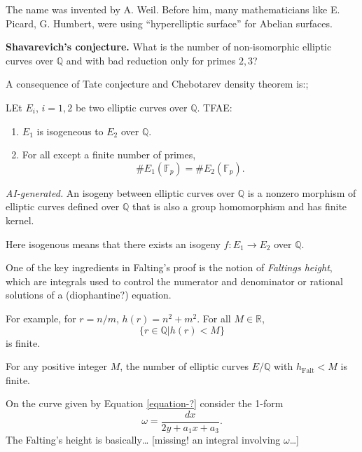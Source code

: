 The name was invented by A. Weil.
Before him, many mathematicians like E.
Picard,
G. Humbert, were using ``hyperelliptic
surface'' for Abelian surfaces.

\medskip\noindent
{\bf Shavarevich's conjecture.} 
What is the number of non-isomorphic elliptic
curves over $\mathbb{Q}$ and with bad
reduction only for primes $2,3$?

\medskip\noindent
A consequence of Tate conjecture
and Chebotarev density theorem is:;

\begin{theorem}
\label{theorem-tate-chebot-consequence}
LEt $E_i$, $i=1,2$ be two
elliptic curves over $\mathbb{Q}$.
TFAE:
\begin{enumerate}
\item $E_1$ is isogeneous to $E_2$
over $\mathbb{Q}$.
\item For all except a finite number
of primes,
$$
\# E_1(\mathbb{F}_p)
=\# E_2(\mathbb{F}_p).
$$
\end{enumerate}
\end{theorem}

\begin{definition}
\label{definition-isogeny}
{\it AI-generated.}
An isogeny between elliptic curves over
$\mathbb{Q}$ is a nonzero morphism of
elliptic curves defined over $\mathbb{Q}$
that is also a group homomorphism and has
finite kernel.
\end{definition}

Here isogenous means that there exists an
isogeny $f:E_1 \to E_2$ over $\mathbb{Q}$.

\medskip\noindent
One of the key ingredients
in Falting's proof
is the notion of {\it Faltings height},
which are integrals used to
control the numerator and denominator
or rational solutions of a (diophantine?)
equation.

For example, for $r = n/m$,
$h(r)=n^2+m^2$. For all $M \in \mathbb{R}$,
$$
\{r \in \mathbb{Q}| h(r)<M\}
$$
is finite.

\begin{proposition}
\label{proposition-faltings-height}
For any positive integer $M$,
the number of elliptic curves $E/\mathbb{Q}$
with $h_{\text{Falt}}<M$ is finite.
\end{proposition}

\noindent
On the curve given by Equation
\ref{equation-?}
consider the 1-form
$$
\omega=\frac{dx}{2y+a_1x+a_3}.
$$
The Falting's height is basically…
[missing! an integral involving $\omega$…]

